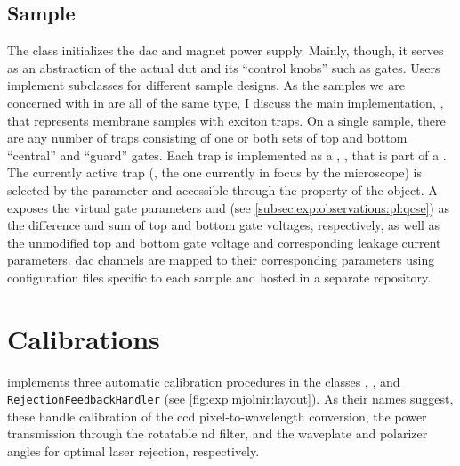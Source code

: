 \subsection{Sample}\label{subsec:exp:mjolnir:logical_instruments:sam}
The  class initializes the \qdac \gls{dac} and magnet power supply.
Mainly, though, it serves as an abstraction of the actual \gls{dut} and its \enquote{control knobs} such as gates.
Users implement subclasses for different sample designs.
As the samples we are concerned with in \thethesis are all of the same type, I discuss the main implementation, , that represents membrane samples with exciton traps.
On a single sample, there are any number of traps consisting of one or both sets of top and bottom \enquote{central} and \enquote{guard} gates.
Each trap is implemented as a \qcodes {}, , that is part of a .
The currently active trap (\ie, the one currently in focus by the microscope) is selected by the  parameter and accessible through the  property of the  object.
A  exposes the virtual gate parameters
 and  (see \cref{subsec:exp:observations:pl:qcse}) as the difference and sum of top and bottom gate voltages, respectively, as well as the unmodified top and bottom gate voltage and corresponding leakage current parameters.
\Gls{dac} channels are mapped to their corresponding  parameters using  configuration files specific to each sample and hosted in a separate repository.

\section{Calibrations}\label{sec:exp:mjolnir:calibration}
\mjolnir implements three automatic calibration procedures in the classes , , and \texttt{RejectionFeedbackHandler} (see \cref{fig:exp:mjolnir:layout}).
As their names suggest, these handle calibration of the \gls{ccd} pixel-to-wavelength conversion, the power transmission through the rotatable \gls{nd} filter, and the waveplate and polarizer angles for optimal laser rejection, respectively.

